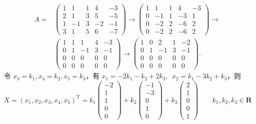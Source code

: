 \begin{exercise}
\begin{exgroup}
        \begin{answer}
            \begin{align*}
                A ={} &
                \begin{pmatrix}
                    1 & 1  & 1 & 4  & -3 \\
                    2 & 1  & 3 & 5  & -5 \\
                    1 & -1 & 3 & -2 & -1 \\
                    3 & 1  & 5 & 6  & -7
                \end{pmatrix}
                \rightarrow
                \begin{pmatrix}
                    1 & 1  & 1 & 4  & -3 \\
                    0 & -1 & 1 & -3 & 1  \\
                    0 & -2 & 2 & -6 & 2  \\
                    0 & -2 & 2 & -6 & 2
                \end{pmatrix} \rightarrow \\
                      &
                \begin{pmatrix}
                    1 & 1 & 1  & 4 & -3 \\
                    0 & 1 & -1 & 3 & -1 \\
                    0 & 0 & 0  & 0 & 0  \\
                    0 & 0 & 0  & 0 & 0
                \end{pmatrix}
                \rightarrow
                \begin{pmatrix}
                    1 & 0 & 2  & 1 & -2 \\
                    0 & 1 & -1 & 3 & -1 \\
                    0 & 0 & 0  & 0 & 0  \\
                    0 & 0 & 0  & 0 & 0
                \end{pmatrix}.
            \end{align*}
            令 $ x_3 = k_1, x_4 = k_2, x_5 = k_3$，有 $x_1 = -2k_1 - k_2 + 2k_3,\enspace\allowbreak x_2 = k_1 - 3k_2 + k_3 $，则
            \[ X = (x_1, x_2, x_3, x_4, x_5)^\mathrm{T} = k_1 \begin{pmatrix} -2 \\ 1 \\ 1 \\ 0 \\ 0 \end{pmatrix} + k_2 \begin{pmatrix} -1 \\ -3 \\ 0 \\ 1 \\ 0 \end{pmatrix} + k_3 \begin{pmatrix} 2 \\ 1 \\ 0 \\ 0 \\ 1 \end{pmatrix} \qquad k_1, k_2, k_3 \in \mathbf{R} \]
        \end{answer}


\end{exgroup}
\end{exercise}
